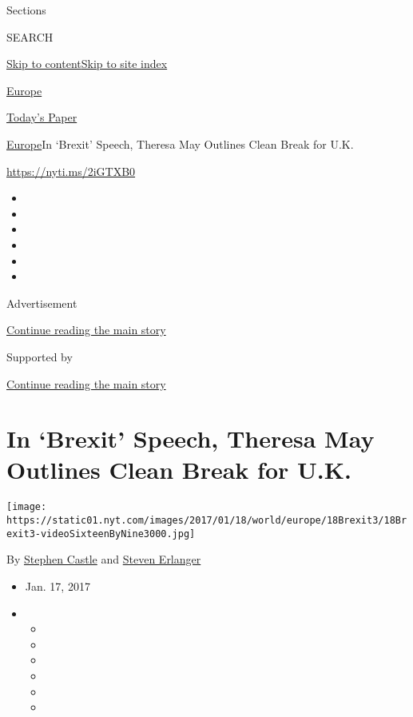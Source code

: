 Sections

SEARCH

\protect\hyperlink{site-content}{Skip to
content}\protect\hyperlink{site-index}{Skip to site index}

\href{https://www.nytimes.com/section/world/europe}{Europe}

\href{https://myaccount.nytimes.com/auth/login?response_type=cookie\&client_id=vi}{}

\href{https://www.nytimes.com/section/todayspaper}{Today's Paper}

\href{/section/world/europe}{Europe}\textbar{}In `Brexit' Speech,
Theresa May Outlines Clean Break for U.K.

\url{https://nyti.ms/2iGTXB0}

\begin{itemize}
\item
\item
\item
\item
\item
\item
\end{itemize}

Advertisement

\protect\hyperlink{after-top}{Continue reading the main story}

Supported by

\protect\hyperlink{after-sponsor}{Continue reading the main story}

\hypertarget{in-brexit-speech-theresa-may-outlines-clean-break-for-uk}{%
\section{In `Brexit' Speech, Theresa May Outlines Clean Break for
U.K.}\label{in-brexit-speech-theresa-may-outlines-clean-break-for-uk}}

\texttt{[image: https://static01.nyt.com/images/2017/01/18/world/europe/18Brexit3/18Brexit3-videoSixteenByNine3000.jpg]}

By \href{http://www.nytimes.com/by/stephen-castle}{Stephen Castle} and
\href{http://www.nytimes.com/by/steven-erlanger}{Steven Erlanger}

\begin{itemize}
\item
  Jan. 17, 2017
\item
  \begin{itemize}
  \item
  \item
  \item
  \item
  \item
  \item
  \end{itemize}
\end{itemize}

